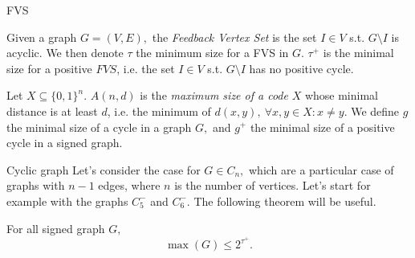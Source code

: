 \documentclass{beamer}
\begin{document}
\begin{frame}{FVS}
    \begin{definition}
    \justifying
        Given a graph $G=(V,E),$ the \textit{Feedback Vertex Set} is the set $I \in V$ s.t. $G \setminus I$ is acyclic. We then denote $\tau$ the minimum size for a FVS in $G$. $\tau^+$ is the minimal size for a positive $FVS$, i.e. the set $I \in V$ s.t. $G \setminus I$ has no positive cycle.
    \end{definition}
    
    \begin{definition}
        \justifying
        Let $X \subseteq \{0,1\}^n$. $A(n,d)$ is the \textit{maximum size of a code} $X$ whose minimal distance is at least $d$, i.e. the minimum of $d(x,y),\ \forall x,y \in X : x\neq y.$ We define $g$ the minimal size of a cycle in a graph $G,$ and $g^+$ the minimal size of a positive cycle in a signed graph. 
    \end{definition}
\end{frame}

\begin{frame}{Cyclic graph}
    \justifying
    Let's consider the case for $G \in C_n,$ which are a particular case of graphs with $n-1$ edges, where $n$ is the number of vertices. Let's start for example with the graphs $C_5^-$ and $C_6^-.$ The following theorem will be useful.
    \begin{theorem}
    For all signed graph $G,$ 
    \[
        \max(G) \leq 2^{\tau^+}.
    \]
    \end{theorem}
\end{frame}
\end{document}
